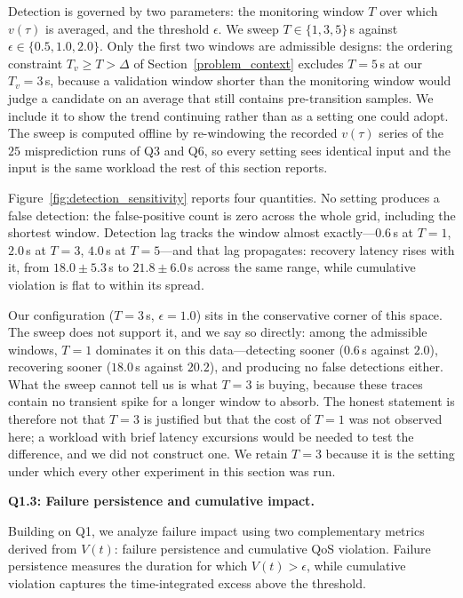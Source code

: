 \documentclass[conference]{IEEEtran}
\begin{document}
{\color{navyblue}%
Detection is governed by two parameters: the monitoring window $T$ over which $v(\tau)$ is averaged, and the threshold $\epsilon$. We sweep $T \in \{1,3,5\}$\,s against $\epsilon \in \{0.5, 1.0, 2.0\}$. \textcolor{navyblue}{Only the first two windows are admissible designs: the ordering constraint $T_v \ge T > \Delta$ of Section~\ref{problem_context} excludes $T=5$\,s at our $T_v=3$\,s, because a validation window shorter than the monitoring window would judge a candidate on an average that still contains pre-transition samples. We include it to show the trend continuing rather than as a setting one could adopt.} \textcolor{navyblue}{The sweep is computed offline by re-windowing the recorded $v(\tau)$ series of the $25$ misprediction runs of Q3 and Q6, so every setting sees identical input and the input is the same workload the rest of this section reports.}

\textcolor{navyblue}{Figure~\ref{fig:detection_sensitivity} reports four quantities. No setting produces a false detection: the false-positive count is zero across the whole grid, including the shortest window. Detection lag tracks the window almost exactly---$0.6$\,s at $T=1$, $2.0$\,s at $T=3$, $4.0$\,s at $T=5$---and that lag propagates: recovery latency rises with it, from $18.0\pm5.3$\,s to $21.8\pm6.0$\,s across the same range, while cumulative violation is flat to within its spread.}

Our configuration ($T=3$\,s, $\epsilon=1.0$) sits in the conservative corner of this space. \textcolor{navyblue}{The sweep does not support it, and we say so directly: among the admissible windows, $T=1$ dominates it on this data---detecting sooner ($0.6$\,s against $2.0$), recovering sooner ($18.0$\,s against $20.2$), and producing no false detections either. What the sweep cannot tell us is what $T=3$ is buying, because these traces contain no transient spike for a longer window to absorb. The honest statement is therefore not that $T=3$ is justified but that the cost of $T=1$ was not observed here; a workload with brief latency excursions would be needed to test the difference, and we did not construct one. We retain $T=3$ because it is the setting under which every other experiment in this section was run.}

\vspace{0.5em}
\noindent\textbf{Q1.3: Failure persistence and cumulative impact.}

Building on Q1, we analyze failure impact using two complementary metrics derived from $V(t)$: failure persistence and cumulative QoS violation. 
Failure persistence measures the duration for which $V(t) > \epsilon$, while cumulative violation captures the time-integrated excess above the threshold.

}
\end{document}

